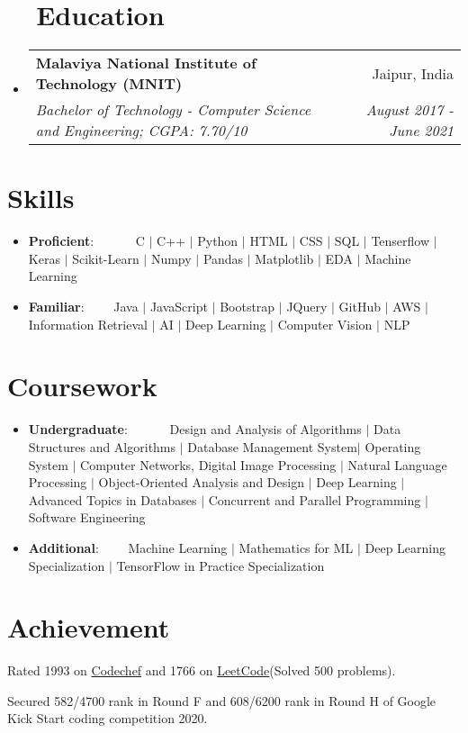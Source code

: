 \documentclass[a4paper,20pt]{article}
\makeatletter
\newcommand{\resumeItem}[2]{
  \item\small{
    \textbf{#1}{: #2 \vspace{-2pt}}
  }
}
\newcommand{\resumeSubheading}[4]{
  \vspace{-1pt}\item
    \begin{tabular*}{0.97\textwidth}{l@{\extracolsep{\fill}}r}
      \textbf{#1} & #2 \\
      \textit{#3} & \textit{#4} \\
    \end{tabular*}\vspace{-5pt}
}
\newcommand{\resumeSubItem}[2]{\resumeItem{#1}{#2}\vspace{-3pt}}
\newcommand{\resumeSubHeadingListStart}{\begin{itemize}[leftmargin=*]}
\newcommand{\resumeSubHeadingListEnd}{\end{itemize}}
\makeatother
\begin{document}
\section{~~Education}
  \resumeSubHeadingListStart
    \resumeSubheading
      {Malaviya National Institute of Technology (MNIT)}{Jaipur, India}
      {Bachelor of Technology - Computer Science and Engineering;  CGPA: 7.70/10}{August 2017 - June 2021}
    \resumeSubHeadingListEnd

\vspace{-3pt}
\section{Skills}
	\resumeSubHeadingListStart
	\resumeSubItem{Proficient}{~~~~~~C $|$ C++ $|$ Python $|$ HTML $|$ CSS $|$ SQL $|$ Tenserﬂow $|$ Keras $|$ Scikit-Learn $|$ Numpy $|$ Pandas $|$ Matplotlib $|$ EDA $|$ Machine Learning}
	\resumeSubItem{Familiar}{~~~~Java $|$ JavaScript $|$ Bootstrap $|$ JQuery $|$ GitHub $|$ AWS $|$ Information Retrieval $|$ AI $|$ Deep Learning $|$ Computer Vision $|$ NLP}
	\resumeSubHeadingListEnd

\vspace{-3pt}
\section{Coursework}
	\resumeSubHeadingListStart
	\resumeSubItem{Undergraduate}{~~~~~~Design and Analysis of Algorithms $|$ Data Structures and Algorithms $|$ Database Management System$|$ Operating System $|$ Computer Networks, Digital Image Processing $|$ Natural Language Processing $|$ Object-Oriented Analysis and Design $|$ Deep Learning $|$ Advanced Topics in Databases $|$ Concurrent and Parallel Programming $|$ Software Engineering}
	\resumeSubItem{Additional}{~~~~Machine Learning $|$ Mathematics for ML $|$ Deep Learning Specialization $|$ TensorFlow in Practice Specialization}
	\resumeSubHeadingListEnd

\vspace{-3pt}
\section{Achievement}
\begin{description}[font=$\bullet$]
\item {Rated 1993 on \href{https://www.codechef.com/users/khimrajsuthar}{Codechef} and 1766 on \href{https://leetcode.com/khimrajsuthar/}{LeetCode}(Solved 500 problems).}
\vspace{-5pt}
\item {Secured 582/4700 rank in Round F and 608/6200 rank in Round H of Google Kick Start coding competition 2020.}

\end{description}
\end{document}
